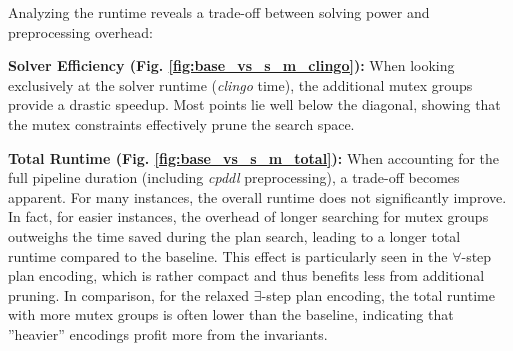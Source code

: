 \documentclass[
     11pt,                    %
     a4paper,             %
     BCOR=10mm,     %
     DIV=14,                 %
     listof=totoc,                    %
     bibliography=totoc,       %
     index=totoc,              %
     parskip            %
     twoside,
     headsepline
     ]{scrreprt}
\theoremstyle{definition}
\theoremstyle{definition}
\theoremstyle{remark}
\theoremstyle{bfnote}
\begin{document}
Analyzing the runtime reveals a trade-off between solving power and preprocessing overhead:

\textbf{Solver Efficiency (Fig. \ref{fig:base_vs_s_m_clingo}):} When looking exclusively at the solver runtime (\textit{clingo} time), the additional mutex groups provide a drastic speedup. Most points lie well below the diagonal, showing that the mutex constraints effectively prune the search space.

\textbf{Total Runtime (Fig. \ref{fig:base_vs_s_m_total}):} When accounting for the full pipeline duration (including \textit{cpddl} preprocessing), a trade-off becomes apparent. 
For many instances, the overall runtime does not significantly improve. In fact, for easier instances, the overhead of longer searching for mutex groups outweighs the time saved during the plan search, leading to a longer total runtime compared to the baseline.
This effect is particularly seen in the $\forall$-step plan encoding, which is rather compact and thus benefits less from additional pruning.
In comparison, for the relaxed $\exists$-step plan encoding, the total runtime with more mutex groups is often lower than the baseline, indicating that ''heavier'' encodings profit more from the invariants.
\end{document}
